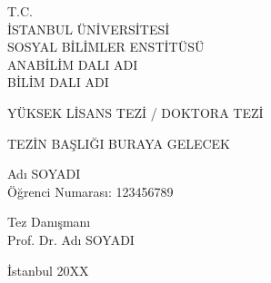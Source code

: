\begin{titlepage}
\begin{center}
    \bfseries
    \fontsize{14pt}{18pt}\selectfont

    T.C.\\
    İSTANBUL ÜNİVERSİTESİ\\
    SOSYAL BİLİMLER ENSTİTÜSÜ\\
    ANABİLİM DALI ADI\\
    BİLİM DALI ADI

    \vspace{2cm}

    \fontsize{14pt}{18pt}\selectfont
    YÜKSEK LİSANS TEZİ / DOKTORA TEZİ

    \vspace{2cm}

    \fontsize{18pt}{22pt}\selectfont
    TEZİN BAŞLIĞI BURAYA GELECEK

    \vspace{2.5cm}

    \fontsize{14pt}{18pt}\selectfont
    Adı SOYADI\\
    Öğrenci Numarası: 123456789

    \vfill

    \fontsize{14pt}{18pt}\selectfont
    Tez Danışmanı\\
    Prof. Dr. Adı SOYADI

    \vspace{1.5cm}

    \fontsize{14pt}{18pt}\selectfont
    İstanbul 20XX

\end{center}
\end{titlepage}

